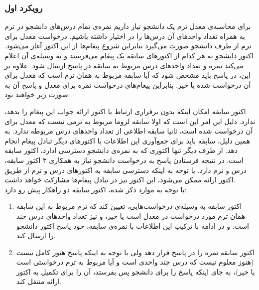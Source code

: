 \subsubsection{رویکرد اول}
\label{gpa_approach1}
برای محاسبه‌ی معدل ترم یک دانشجو نیاز داریم نمره‌ی تمام درس‌های دانشجو در ترم به همراه تعداد واحد‌های آن درس‌ها را در اختیار داشته باشیم. درخواست معدل برای ترم از طرف دانشجو صورت می‌گیرد بنابراین شروع پیغام‌ها از این اکتور آغاز می‌شود.
 اکتور دانشجو به هر کدام از اکتور‌های سابقه یک پیغام می‌فرستد و به وسیله‌ی آن اعلام می‌کند نمره و تعداد واحد‌های درس مربوط به سابقه در پاسخ ارسال شود. علاوه بر این، در پاسخ باید مشخص شود که آیا سابقه‌ مربوط به همان ترم است که معدل برای آن درخواست شده یا خیر. بنابراین پیغام‌های  درخواست نمره برای معدل و پاسخ آن به صورت زیر خواهند بود:
\begin{latin}
 \begin{description}
 \item[]
  \item[]
 \end{description}
 \end{latin}
  اکتور سابقه امکان اینکه بدون برقراری ارتباط با اکتور ارائه جواب این پیغام را بدهد، ندارد. دلیل این امر این است که اولا سابقه‌ لزوما مربوط به ترمی نیست که معدل برای آن درخواست شده است، ثانیا سابقه اطلاعی از تعداد واحد‌های درس مربوطه ندارد. به همین دلیل، سابقه باید برای جمع‌آوری این اطلاعات با اکتورهای دیگر تبادل پیغام انجام دهد. از طرف دیگر تنها اکتوری که به نمره‌ی دانشجو دسترسی ادارد، اکتور سابقه است. در نتیجه فرستادن پاسخ به درخواست دانشجو نیاز به همکاری ۳ اکتور سابقه، درس و ترم دارد. با توجه به اینکه دسترسی سابقه به اکتورهای درس و ترم از طریق اکتور ارائه ممکن می‌شود، این اکتور نیز در تبادل پیغام‌ها مشارکت خواهد داشت.\\
با توجه به موارد ذکر شده، اکتور سابقه دو راهکار پیش رو دارد:
\begin{enumerate}
\item اکتور سابقه به وسیله‌ی درخواست‌هایی، تعیین کند که ترم مربوط به این سابقه همان ترم مورد درخواست در معدل است یا خیر، و نیز تعداد واحد‌های درس چند است. و  در ادامه با ترکیب این اطلاعات با نمره‌ی سابقه، خود پاسخ اکتور دانشجو را ارسال کند.
\item اکتور سابقه نمره را در پاسخ قرار دهد ولی با توجه به اینکه پاسخ هنوز کامل نیست (هنوز معلوم نیست که درس چند واحدی است و آیا مربوط به ترم درخواستی است یا خیر)، به جای اینکه پاسخ را برای دانشجو پس بفرستد، آن را برای تکمیل به اکتور ارائه منتقل کند.
\end{enumerate} 
